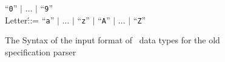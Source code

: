 \begin{figure}[htbp]
\begin{center}
{\begin{minipage}{5.9in}
\begin{tabbing}
         ``{\tt 0}'' $|$ $\ldots$ $|$ ``{\tt 9}'' \\
\>Letter\'::=\>
         ``{\tt a}'' $|$ $\ldots$ $|$ ``{\tt z}'' $|$  
         ``{\tt A}'' $|$ $\ldots$ $|$ ``{\tt Z}'' \\
\end{tabbing}
\end{minipage} 
}
\end{center}
\caption{The Syntax of the input format of \redux\ data types for the old
specification parser} \label{fi:syn.old}
\end{figure}
